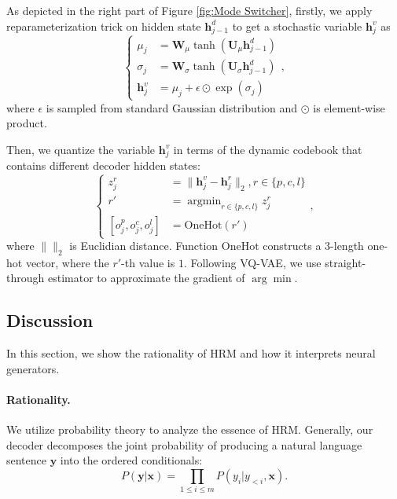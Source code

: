 \documentclass[letterpaper]{article} %
\begin{document}
	As depicted in the right part of Figure \ref{fig:Mode Switcher}, firstly, we apply reparameterization trick on hidden state $\mathbf{h}^d_{j-1}$ to get a stochastic variable $\mathbf{h}^v_j$ as
	\begin{equation}
	\left\{\begin{aligned}			 
	\mu_j & = \mathbf{W}_{\mu}\tanh(\mathbf{U}_{\mu}\mathbf{h}^d_{j-1}) \\
	\sigma_j & = \mathbf{W}_{\sigma}\tanh(\mathbf{U}_{\sigma}\mathbf{h}^d_{j-1}) \\
	\mathbf{h}^v_j & = \mu_j + \epsilon \odot \exp(\sigma_j)
	\end{aligned}\right.,
	\end{equation}
	where $\epsilon$ is sampled from standard Gaussian distribution and $\odot$ is element-wise product.
	
	Then, we quantize the variable $\mathbf{h}^v_j$ in terms of the dynamic codebook that contains different decoder hidden states:
	\begin{equation} 
	\left\{\begin{aligned}	
	z_j^r & = \| \mathbf{h}^v_j  - \mathbf{h}^r_j  \|_2, r \in \{p, c, l\} \\
	r' & = \mathop{\arg\min}_{r \in \{p, c, l\}} z_j^r \\
	[ o_j^p, o_j^c, o_j^l ] & = \mathrm{OneHot}(r')
	\end{aligned}\right.,
	\end{equation} 
	where $\|\|_2$ is Euclidian distance. Function $\mathrm{OneHot}$ constructs a $3$-length one-hot vector, where the $r'$-th value is $1$. Following VQ-VAE, we use straight-through estimator to approximate the gradient of $\arg\min$.
	
	\subsection{Discussion}
	\label{sec:Discussion}
	
	In this section, we show the rationality of HRM and how it interprets neural generators.
	
	\paragraph{Rationality.} We utilize probability theory to analyze the essence of HRM. Generally, our decoder decomposes the joint probability of producing a natural language sentence $\mathbf{y}$ into the ordered conditionals:
	\begin{equation}
	P(\mathbf{y} | \mathbf{x}) = \prod_{1 \le i \le m} P(y_i | y_{<i}, \mathbf{x}).
	\end{equation}  
	
\end{document}
